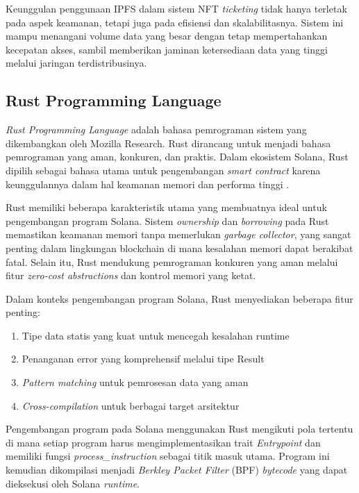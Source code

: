 Keunggulan penggunaan IPFS dalam sistem NFT \textit{ticketing} tidak hanya terletak pada aspek keamanan, tetapi juga pada efisiensi dan skalabilitasnya. Sistem ini mampu menangani volume data yang besar dengan tetap mempertahankan kecepatan akses, sambil memberikan jaminan ketersediaan data yang tinggi melalui jaringan terdistribusinya.

\subsection{Rust Programming Language}
\textit{Rust Programming Language} adalah bahasa pemrograman sistem yang dikembangkan oleh Mozilla Research. Rust dirancang untuk menjadi bahasa pemrograman yang aman, konkuren, dan praktis. Dalam ekosistem Solana, Rust dipilih sebagai bahasa utama untuk pengembangan \textit{smart contract} karena keunggulannya dalam hal keamanan memori dan performa tinggi \parencite{ref13}.

Rust memiliki beberapa karakteristik utama yang membuatnya ideal untuk pengembangan program Solana. Sistem \textit{ownership} dan \textit{borrowing} pada Rust memastikan keamanan memori tanpa memerlukan \textit{garbage collector}, yang sangat penting dalam lingkungan blockchain di mana kesalahan memori dapat berakibat fatal. Selain itu, Rust mendukung pemrograman konkuren yang aman melalui fitur \textit{zero-cost abstractions} dan kontrol memori yang ketat.

Dalam konteks pengembangan program Solana, Rust menyediakan beberapa fitur penting:
\begin{enumerate}[noitemsep,topsep=0pt]
   \item Tipe data statis yang kuat untuk mencegah kesalahan runtime
   \item Penanganan error yang komprehensif melalui tipe Result
   \item \textit{Pattern matching} untuk pemrosesan data yang aman
   \item \textit{Cross-compilation} untuk berbagai target arsitektur
\end{enumerate}

Pengembangan program pada Solana menggunakan Rust mengikuti pola tertentu di mana setiap program harus mengimplementasikan trait \textit{Entrypoint} dan memiliki fungsi \textit{process\_instruction} sebagai titik masuk utama. Program ini kemudian dikompilasi menjadi \textit{Berkley Packet Filter} (BPF) \textit{bytecode} yang dapat dieksekusi oleh Solana \textit{runtime}.

